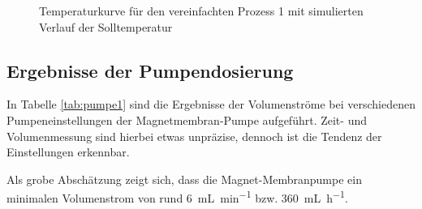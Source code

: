 \begin{figure}[h!]
\begin{center}
{
		}
		\caption[Temperaturkurve für den vereinfachten Prozess 1]{Temperaturkurve für den vereinfachten Prozess 1 mit simulierten Verlauf der Solltemperatur}
		\label{dia:temp_graphen}
	\end{center}
\end{figure}
\FloatBarrier

\subsection*{Ergebnisse der Pumpendosierung}

In Tabelle \ref{tab:pumpe1} sind die Ergebnisse der Volumenströme bei verschiedenen Pumpeneinstellungen der Magnetmembran-Pumpe aufgeführt. Zeit- und Volumenmessung sind hierbei etwas unpräzise, dennoch ist die Tendenz der Einstellungen erkennbar.
\begin{table}[h!]
	\renewcommand*{\arraystretch}{1.2}
	\centering
	\caption{Volumenströme der Magnet-Membranpumpe in verschiedenen Einstellungen}
	\label{tab:pumpe1}
\end{table}%
\FloatBarrier
Als grobe Abschätzung zeigt sich, dass die Magnet-Membranpumpe ein minimalen Volumenstrom von rund \SI{6}{\milli \liter \per \minute} bzw. \SI{360}{\milli \liter \per \hour}. \\

